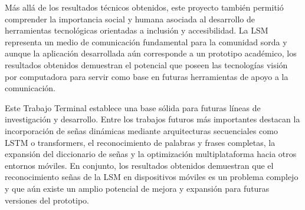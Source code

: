 	Más allá de los resultados técnicos obtenidos, este proyecto también permitió comprender la importancia social y humana asociada al desarrollo de herramientas tecnológicas orientadas a inclusión y accesibilidad. La LSM representa un medio de comunicación fundamental para la comunidad sorda y aunque la aplicación desarrollada aún corresponde a un prototipo académico, los resultados obtenidos demuestran el potencial que poseen las tecnologías visión por computadora para servir como base en futuras herramientas de apoyo a la comunicación.
	
	Este Trabajo Terminal establece una base sólida para futuras líneas de investigación y desarrollo. Entre los trabajos futuros más importantes destacan la incorporación de señas dinámicas mediante arquitecturas secuenciales como LSTM o transformers, el reconocimiento de palabras y frases completas, la expansión del diccionario de señas y la optimización multiplataforma hacia otros entornos móviles. En conjunto, los resultados obtenidos demuestran que el reconocimiento señas de la LSM en dispositivos móviles es un problema complejo y que aún existe un amplio potencial de mejora y expansión para futuras versiones del prototipo.
	
	\newpage
	
